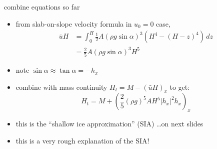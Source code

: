 \begin{frame}{combine equations so far}

\begin{itemize}
\item from slab-on-slope velocity formula in $u_0=0$ case,
\begin{align*}
\bar u H &= \int_0^H \frac{1}{2} A (\rho g \sin\alpha)^3  \left(H^4 - (H-z)^4\right)\,dz \\
	&= \frac{2}{5} A (\rho g \sin\alpha)^3 H^5
\end{align*}
\item note $\sin \alpha \approx \tan\alpha = - h_x$
\item combine with mass continuity $H_t = M - \left(\bar u H\right)_x$ to get:
  $$H_t = M + \left(\frac{2}{5} (\rho g)^5 A H^5 |h_x|^2 h_x\right)_x$$

\medskip
\item this is the ``shallow ice approximation'' (SIA) \dots on next slides
\item this is a very rough explanation of the SIA!
\end{itemize}
\end{frame}
